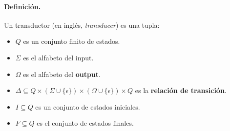 \paragraph{Definición.} Un transductor (en inglés, \textit{transducer}) es una tupla:
\begin{itemize}
    \item $Q$ es un conjunto finito de estados.
    \item $\Sigma$ es el alfabeto del input.
    \item $\Omega$ es el alfabeto del \textbf{output}.
    \item $\Delta \subseteq Q \times(\Sigma \cup\{\epsilon\}) \times(\Omega \cup\{\epsilon\}) \times Q$ es la \textbf{relación de transición}.
    \item $I \subseteq Q$ es un conjunto de estados iniciales.
    \item $F \subseteq Q$ es el conjunto de estados finales.
\end{itemize}


